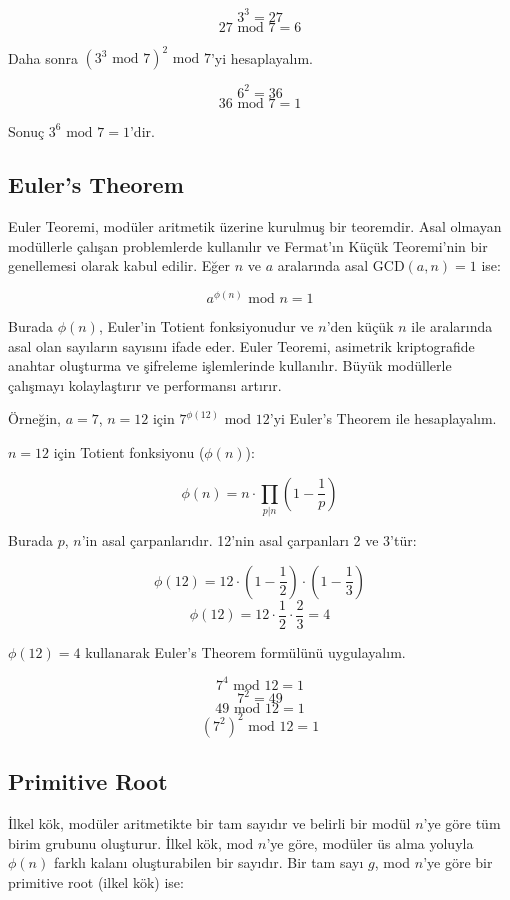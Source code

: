 \[ 3^3 = 27 \]
\[ 27 \text{ mod } 7 = 6 \]

Daha sonra $(3^3 \text{ mod } 7)^2 \text{ mod } 7$'yi hesaplayalım.

\[ 6^2 = 36 \]
\[ 36 \text{ mod } 7 = 1 \]

Sonuç $3^6 \text{ mod } 7 = 1$'dir.

\newpage

\subsection{Euler's Theorem}

Euler Teoremi, modüler aritmetik üzerine kurulmuş bir teoremdir. Asal olmayan modüllerle çalışan problemlerde kullanılır ve Fermat'ın Küçük Teoremi'nin bir genellemesi olarak kabul edilir. Eğer $n$ ve $a$ aralarında asal $\text{GCD}(a, n) = 1$ ise:

\[ a^{\phi(n)} \text{ mod } n = 1 \]

Burada $\phi(n)$, Euler'in Totient fonksiyonudur ve $n$'den küçük $n$ ile aralarında asal olan sayıların sayısını ifade eder. Euler Teoremi, asimetrik kriptografide anahtar oluşturma ve şifreleme işlemlerinde kullanılır. Büyük modüllerle çalışmayı kolaylaştırır ve performansı artırır. 

Örneğin, $a = 7$, $n = 12$ için $7^{\phi(12)} \text{ mod } 12$'yi Euler's Theorem ile hesaplayalım.

$n = 12$ için Totient fonksiyonu ($\phi(n)$):

\[ \phi(n) = n \cdot \prod_{p | n} (1 - \frac{1}{p}) \]

Burada $p$, $n$'in asal çarpanlarıdır. 12'nin asal çarpanları 2 ve 3'tür:

\[ \phi(12) = 12 \cdot (1 - \frac{1}{2}) \cdot (1 - \frac{1}{3}) \]
\[ \phi(12) = 12 \cdot \frac{1}{2} \cdot \frac{2}{3} = 4\]

$\phi(12) = 4$ kullanarak Euler's Theorem formülünü uygulayalım.

\[ 7^4 \text{ mod } 12 = 1 \]
\[ 7^2 = 49\]
\[ 49 \text{ mod } 12 = 1 \]
\[ (7^2)^2 \text{ mod } 12 = 1 \]

\newpage

\subsection{Primitive Root}

İlkel kök, modüler aritmetikte bir tam sayıdır ve belirli bir modül $n$'ye göre tüm birim grubunu oluşturur. İlkel kök, mod $n$'ye göre, modüler üs alma yoluyla $\phi(n)$ farklı kalanı oluşturabilen bir sayıdır. Bir tam sayı $g$, mod $n$'ye göre bir primitive root (ilkel kök) ise:

